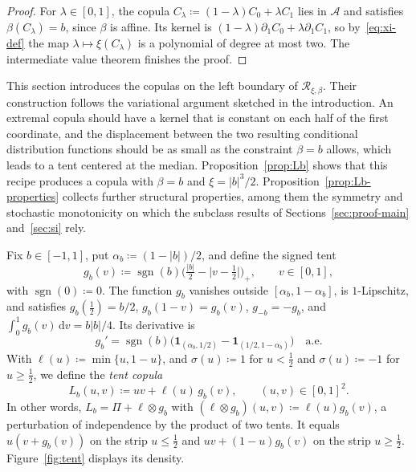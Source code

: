 \documentclass[twocolumn,a4paper]{article}
\makeatletter
\renewcommand\section{\@startsection{section}{1}{\z@}{-3.5ex \@plus -1ex \@minus -.2ex}{2.3ex \@plus.2ex}{\normalfont\Large\bfseries\raggedright}}
\numberwithin{equation}{section}
\theoremstyle{remark}
\newcommand{\RR}{\mathcal{R}}
\newcommand{\AAA}{\mathcal{A}}
\newcommand{\1}{\mathbf{1}}
\newcommand{\sgn}{\operatorname{sgn}}
\newcommand{\de}{\,\mathrm{d}}
\makeatother
\begin{document}
\begin{proof}
For \(\lambda\in[0,1]\), the copula \(C_\lambda\coloneqq(1-\lambda)C_0+\lambda C_1\) lies in \(\AAA\) and satisfies \(\beta(C_\lambda)=b\), since \(\beta\) is affine.
Its kernel is \((1-\lambda)\partial_1C_0+\lambda\partial_1C_1\), so by~\eqref{eq:xi-def} the map \(\lambda\mapsto\xi(C_\lambda)\) is a polynomial of degree at most two.
The intermediate value theorem finishes the proof.
\end{proof}

\section{Tent copulas}\label{sec:tent}

This section introduces the copulas on the left boundary of \(\RR_{\xi,\beta}\).
Their construction follows the variational argument sketched in the introduction.
An extremal copula should have a kernel that is constant on each half of the first coordinate, and the displacement between the two resulting conditional distribution functions should be as small as the constraint \(\beta=b\) allows, which leads to a tent centered at the median.
Proposition~\ref{prop:Lb} shows that this recipe produces a copula with \(\beta=b\) and \(\xi=|b|^3/2\).
Proposition~\ref{prop:Lb-properties} collects further structural properties, among them the symmetry and stochastic monotonicity on which the subclass results of Sections~\ref{sec:proof-main} and~\ref{sec:si} rely.

Fix \(b\in[-1,1]\), put \(\alpha_b\coloneqq(1-|b|)/2\), and define the signed tent
\begin{equation}\label{eq:tent}
g_b(v)\coloneqq\sgn(b)\bigl(\tfrac{|b|}2-\bigl|v-\tfrac12\bigr|\bigr)_+,\qquad v\in[0,1],
\end{equation}
with \(\sgn(0)\coloneqq0\).
The function \(g_b\) vanishes outside \([\alpha_b,1-\alpha_b]\), is \(1\)-Lipschitz, and satisfies \(g_b(\tfrac12)=b/2\), \(g_b(1-v)=g_b(v)\), \(g_{-b}=-g_b\), and \(\int_0^1g_b(v)\de v=b|b|/4\).
Its derivative is
\[
g_b'=\sgn(b)\bigl(\1_{(\alpha_b,1/2)}-\1_{(1/2,1-\alpha_b)}\bigr)\quad\text{a.e.}
\]
With \(\ell(u)\coloneqq\min\{u,1-u\}\), and \(\sigma(u)\coloneqq1\) for \(u<\tfrac12\) and \(\sigma(u)\coloneqq-1\) for \(u\ge\tfrac12\), we define the \emph{tent copula}
\begin{equation}\label{eq:Lb}
L_b(u,v)\coloneqq uv+\ell(u)\,g_b(v),\qquad(u,v)\in[0,1]^2.
\end{equation}
In other words, \(L_b=\Pi+\ell\otimes g_b\) with \((\ell\otimes g_b)(u,v)\coloneqq\ell(u)g_b(v)\), a perturbation of independence by the product of two tents.
It equals \(u(v+g_b(v))\) on the strip \(u\le\tfrac12\) and \(uv+(1-u)g_b(v)\) on the strip \(u\ge\tfrac12\).
Figure~\ref{fig:tent} displays its density.
\end{document}
